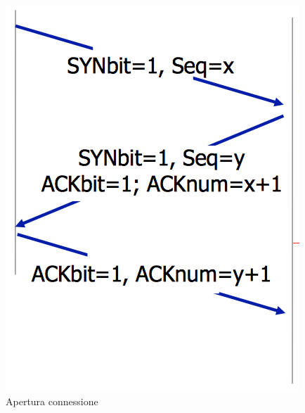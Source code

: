 \documentclass[12pt]{article}
\begin{document}
\begin{figure}[!hbpt]
  \centering
  \begin{minipage}{.45\textwidth}
    \centering
    \includegraphics[width=\linewidth]{images/syn.png}
    \caption{Apertura connessione}
    \label{fig:syn}
  \end{minipage}\hfill
  \begin{minipage}{.45\textwidth}
    \centering

\end{minipage}
\end{figure}
\end{document}
